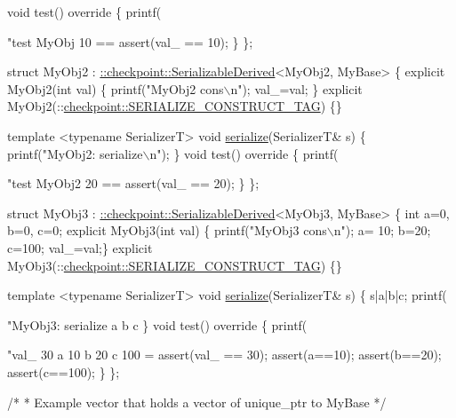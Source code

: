 \begin{DoxyCodeInclude}
{  \textcolor{keywordtype}{void} test()\textcolor{keyword}{ override }\{
    printf(\textcolor{stringliteral}{"test MyObj 10 == %
    assert(val\_ == 10);
  \}
\};

\textcolor{keyword}{struct }MyObj2 : \hyperlink{structcheckpoint_1_1dispatch_1_1vrt_1_1_serializable_derived}{::checkpoint::SerializableDerived}<MyObj2, MyBase> \{
  \textcolor{keyword}{explicit} MyObj2(\textcolor{keywordtype}{int} val) \{ printf(\textcolor{stringliteral}{"MyObj2 cons\(\backslash\)n"}); val\_=val; \}
  \textcolor{keyword}{explicit} MyObj2(::\hyperlink{structcheckpoint_1_1dispatch_1_1_s_e_r_i_a_l_i_z_e___c_o_n_s_t_r_u_c_t___t_a_g}{checkpoint::SERIALIZE\_CONSTRUCT\_TAG}) \{\}

  \textcolor{keyword}{template} <\textcolor{keyword}{typename} SerializerT>
  \textcolor{keywordtype}{void} \hyperlink{namespacecheckpoint_a075da4e7344cf037943362517e606c3a}{serialize}(SerializerT& s) \{
    printf(\textcolor{stringliteral}{"MyObj2: serialize\(\backslash\)n"});
  \}
  \textcolor{keywordtype}{void} test()\textcolor{keyword}{ override }\{
    printf(\textcolor{stringliteral}{"test MyObj2 20 == %
    assert(val\_ == 20);
  \}
\};

\textcolor{keyword}{struct }MyObj3 : \hyperlink{structcheckpoint_1_1dispatch_1_1vrt_1_1_serializable_derived}{::checkpoint::SerializableDerived}<MyObj3, MyBase> \{
  \textcolor{keywordtype}{int} a=0, b=0, c=0;
  \textcolor{keyword}{explicit} MyObj3(\textcolor{keywordtype}{int} val) \{ printf(\textcolor{stringliteral}{"MyObj3 cons\(\backslash\)n"}); a= 10; b=20; c=100; val\_=val;\}
  \textcolor{keyword}{explicit} MyObj3(::\hyperlink{structcheckpoint_1_1dispatch_1_1_s_e_r_i_a_l_i_z_e___c_o_n_s_t_r_u_c_t___t_a_g}{checkpoint::SERIALIZE\_CONSTRUCT\_TAG}) \{\}

  \textcolor{keyword}{template} <\textcolor{keyword}{typename} SerializerT>
  \textcolor{keywordtype}{void} \hyperlink{namespacecheckpoint_a075da4e7344cf037943362517e606c3a}{serialize}(SerializerT& s) \{
    s|a|b|c;
    printf(\textcolor{stringliteral}{"MyObj3: serialize a b c %
  \}
  \textcolor{keywordtype}{void} test()\textcolor{keyword}{ override }\{
    printf(\textcolor{stringliteral}{"val\_ 30  a 10 b 20 c 100 = %
    assert(val\_ == 30);
    assert(a==10);
    assert(b==20);
    assert(c==100);
  \}
\};

\textcolor{comment}{/*}
\textcolor{comment}{ * Example vector that holds a vector of unique\_ptr to MyBase}
\textcolor{comment}{ */}

}}}}}
\end{DoxyCodeInclude}
